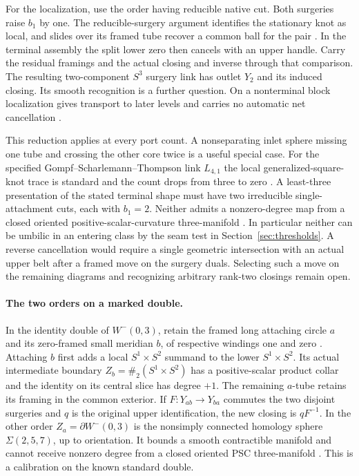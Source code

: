 For the localization, use the order having reducible native cut.
Both surgeries raise \(b_1\) by one. The reducible-surgery argument
identifies the stationary knot as local, and slides over its framed tube
recover a common ball for the pair
\cite[Theorem 6.1 and correction]{Scharlemann1990Reducible}%
\cite{Baker2026HandleCuts}. In the terminal assembly the split lower zero
then cancels with an upper handle. Carry the residual framings and the
actual closing and inverse through that comparison. The resulting
two-component \(S^3\) surgery link has outlet \(Y_2\) and its induced
closing. Its smooth recognition is a further question. On a nonterminal
block localization gives transport to later levels and carries no
automatic net cancellation \cite{Baker2026HandleCuts}.

This reduction applies at every port count. A nonseparating inlet sphere
missing one tube and crossing the other core twice is a useful special
case. For the specified Gompf--Scharlemann--Thompson link \(L_{4,1}\)
the local generalized-square-knot trace is standard and the count drops
from three to zero
\cite{Baker2026HandleCuts,GompfScharlemannThompson2010,MeierZupan2022SquareKnots}.
A least-three presentation of the stated terminal shape must have two
irreducible single-attachment cuts, each with \(b_1=2\). Neither admits
a nonzero-degree map from a closed oriented positive-scalar-curvature
three-manifold \cite{Baker2026HandleCuts}. In particular neither can
be umbilic in an entering class by the seam test in
Section~\ref{sec:thresholds}. A reverse cancellation would require a
single geometric intersection with an actual upper belt after a framed
move on the surgery duals. Selecting such a move on the remaining
diagrams and recognizing arbitrary rank-two closings remain open.


\paragraph{The two orders on a marked double.}
In the identity double of \(W^-(0,3)\), retain the framed long attaching
circle \(a\) and its zero-framed small meridian \(b\), of respective
windings one and zero \cite[Figure 37]{Isoshima2025MazurDoubles}.
Attaching \(b\) first adds a local \(S^1\times S^2\) summand to the
lower \(S^1\times S^2\). Its actual intermediate boundary
\(Z_b=\#_2(S^1\times S^2)\) has a positive-scalar product collar
and the identity on its central slice has degree \(+1\).
The remaining \(a\)-tube retains its framing in the common exterior.
If \(F:Y_{ab}\to Y_{ba}\) commutes the two disjoint surgeries and
\(q\) is the original upper identification, the new closing is
\(qF^{-1}\). In the other order \(Z_a=\partial W^-(0,3)\) is
the nonsimply connected homology sphere \(\Sigma(2,5,7)\), up to
orientation. It bounds a smooth contractible manifold and cannot
receive nonzero degree from a closed oriented PSC three-manifold
\cite{ChodoshMaximoMukherjee2024Complete,Baker2026HandleCuts}.
This is a calibration on the known standard double.

